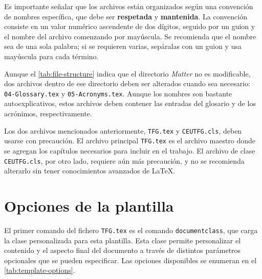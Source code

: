 \medskip

Es importante señalar que los archivos están organizados según una convención de nombres específica, que debe ser \textbf{respetada} y \textbf{mantenida}. La convención consiste en un valor numérico ascendente de dos dígitos, seguido por un guion y el nombre del archivo comenzando por mayúscula. Se recomienda que el nombre sea de una sola palabra; si se requieren varias, sepáralas con un guion y usa mayúscula para cada término.

\begin{nota}
Aunque el \autoref{tab:file-structure} indica que el directorio \textit{Matter} no es modificable, dos archivos dentro de ese directorio deben ser alterados cuando sea necesario: \texttt{04-Glossary.tex} y \texttt{05-Acronyms.tex}. Aunque los nombres son bastante autoexplicativos, estos archivos deben contener las entradas del glosario y de los acrónimos, respectivamente.
\end{nota}

Los dos archivos mencionados anteriormente, \texttt{TFG.tex} y \texttt{CEUTFG.cls}, deben usarse con precaución. El archivo principal \texttt{TFG.tex} es el archivo maestro donde se agregan los capítulos necesarios para incluir en el trabajo. El archivo de clase \texttt{CEUTFG.cls}, por otro lado, requiere aún más precaución, y no se recomienda alterarlo sin tener conocimientos avanzados de \LaTeX.

\section{Opciones de la plantilla}
\label{sec:class-options}

El primer comando del fichero \texttt{TFG.tex} es el comando \texttt{documentclass}, que carga la clase personalizada para esta plantilla. Esta clase permite personalizar el contenido y el aspecto final del documento a través de distintos parámetros opcionales que se pueden especificar. Las opciones disponibles se enumeran en el \autoref{tab:template-options}.

